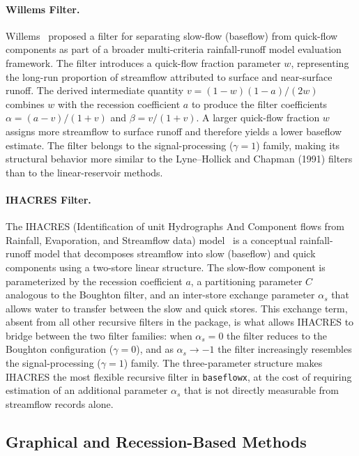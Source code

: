 \documentclass[hydrology,article,submit,pdftex,moreauthors]{Definitions/mdpi}
\begin{document}
\paragraph{Willems Filter.}
Willems~\cite{Willems2009} proposed a filter for separating slow-flow (baseflow) from quick-flow components as part of a broader multi-criteria rainfall-runoff model evaluation framework. The filter introduces a quick-flow fraction parameter $w$, representing the long-run proportion of streamflow attributed to surface and near-surface runoff. The derived intermediate quantity $v = (1-w)(1-a)/(2w)$ combines $w$ with the recession coefficient $a$ to produce the filter coefficients $\alpha = (a-v)/(1+v)$ and $\beta = v/(1+v)$. A larger quick-flow fraction $w$ assigns more streamflow to surface runoff and therefore yields a lower baseflow estimate. The filter belongs to the signal-processing ($\gamma = 1$) family, making its structural behavior more similar to the Lyne--Hollick and Chapman (1991) filters than to the linear-reservoir methods.

\paragraph{IHACRES Filter.}
The IHACRES (Identification of unit Hydrographs And Component flows from Rainfall, Evaporation, and Streamflow data) model~\cite{Jakeman1993} is a conceptual rainfall-runoff model that decomposes streamflow into slow (baseflow) and quick components using a two-store linear structure. The slow-flow component is parameterized by the recession coefficient $a$, a partitioning parameter $C$ analogous to the Boughton filter, and an inter-store exchange parameter $\alpha_s$ that allows water to transfer between the slow and quick stores. This exchange term, absent from all other recursive filters in the package, is what allows IHACRES to bridge between the two filter families: when $\alpha_s = 0$ the filter reduces to the Boughton configuration ($\gamma = 0$), and as $\alpha_s \to -1$ the filter increasingly resembles the signal-processing ($\gamma = 1$) family. The three-parameter structure makes IHACRES the most flexible recursive filter in \texttt{baseflowx}, at the cost of requiring estimation of an additional parameter $\alpha_s$ that is not directly measurable from streamflow records alone.

\subsection{Graphical and Recession-Based Methods}
\label{sec:graphical}
\end{document}
